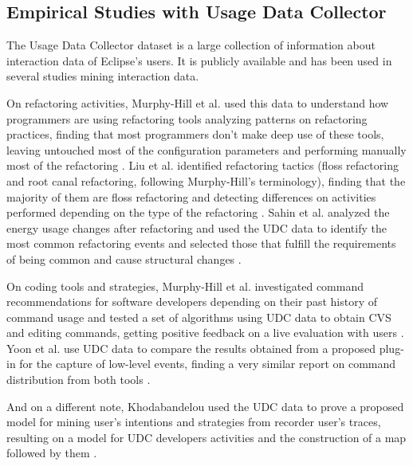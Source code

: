 \documentclass[times]{smrauth}
\begin{document}
\subsection{Empirical Studies with Usage Data Collector}
The Usage Data Collector dataset is a large collection of information about interaction data of Eclipse's users. It is publicly available and has been used in several studies mining interaction data. 

On refactoring activities, Murphy-Hill et al. used this data to understand how programmers are using refactoring tools analyzing patterns on refactoring practices, finding that most programmers don't make deep use of these tools, leaving untouched most of the configuration parameters and performing manually most of the refactoring  \cite{MPB12}. Liu et al. identified refactoring tactics (floss refactoring and root canal refactoring, following Murphy-Hill's terminology), finding that the majority of them are floss refactoring and detecting differences on activities performed depending on the type of the refactoring \cite{LGN12}. Sahin et al. analyzed the energy usage changes after refactoring and used the UDC data to identify the most common refactoring events and selected those that fulfill the requirements of being common and cause structural changes \cite{SPC14}. 

On coding tools and strategies, Murphy-Hill et al. investigated command recommendations for software developers depending on their past history of command usage and tested a set of algorithms using UDC data to obtain CVS and editing commands, getting positive feedback on a live evaluation with users \cite{MJM12}. Yoon et al. use UDC data to compare the results obtained from a proposed plug-in for the capture of low-level events, finding a very similar report on command distribution from both tools \cite{YM11}.

And on a different note, Khodabandelou used the UDC data to prove a proposed model for mining user's intentions and strategies from recorder user's traces, resulting on a model for UDC developers activities and the construction of a map followed by them \cite{KG14}.
\end{document}
